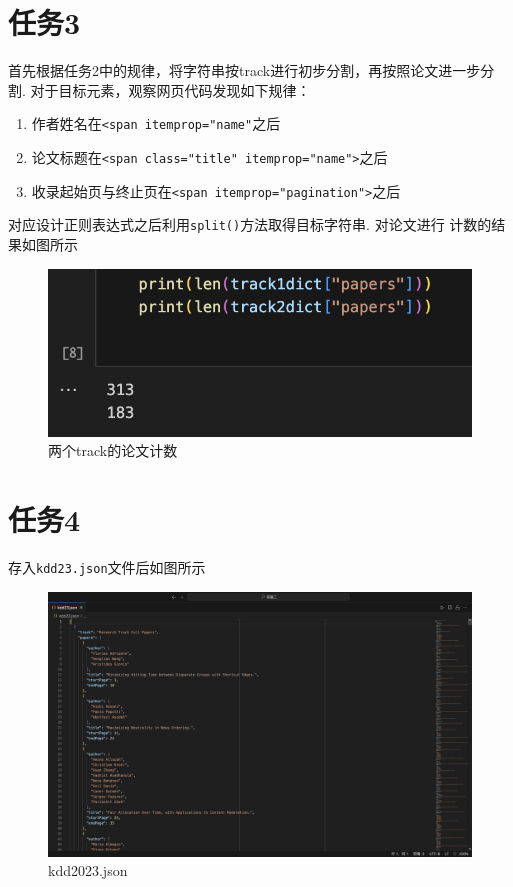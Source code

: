 \documentclass[UTF8]{ctexart}
\begin{document}
\section*{任务3}
首先根据任务2中的规律，将字符串按track进行初步分割，再按照论文进一步分割. 对于目标元素，观察网页代码发现如下规律：
\begin{enumerate}
  \item 作者姓名在\lstinline|<span itemprop="name"|之后
  \item 论文标题在\lstinline|<span class="title" itemprop="name">|之后
  \item 收录起始页与终止页在\lstinline|<span itemprop="pagination">|之后
\end{enumerate}

对应设计正则表达式之后利用\lstinline{split()}方法取得目标字符串. 对论文进行
计数的结果如图所示
\begin{figure}[h]
  \centering
  \includegraphics[scale=0.5]{count.png}
  \caption{两个track的论文计数}
\end{figure}

\section*{任务4}
存入\lstinline|kdd23.json|文件后如图所示
\begin{figure}[h]
  \centering
  \includegraphics[scale=0.2]{kdd2023.png}
  \caption{kdd2023.json}
\end{figure}
\clearpage
\end{document}
